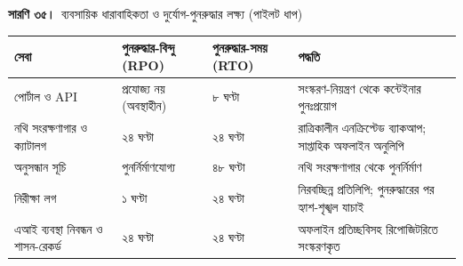 \documentclass[border=10pt]{standalone}
\begin{document}
\begin{minipage}{17cm}
{\large\bfseries সারণি ৩৫।}\ {\large ব্যবসায়িক ধারাবাহিকতা ও দুর্যোগ-পুনরুদ্ধার লক্ষ্য (পাইলট ধাপ)}\par\vspace{7pt}
\small
{}
\begin{tabularx}{\linewidth}{@{}>{\hsize=1.266\hsize\raggedright\arraybackslash}X>{\hsize=0.709\hsize\raggedright\arraybackslash}X>{\hsize=0.709\hsize\raggedright\arraybackslash}X>{\hsize=1.316\hsize\raggedright\arraybackslash}X@{}}
\arrayrulecolor{bapilrule}\toprule
\rowcolor{white}\textbf{সেবা} & \textbf{পুনরুদ্ধার-বিন্দু (RPO)} & \textbf{পুনরুদ্ধার-সময় (RTO)} & \textbf{পদ্ধতি} \\
\midrule
পোর্টাল ও API & প্রযোজ্য নয় (অবস্থাহীন) & ৮ ঘণ্টা & সংস্করণ-নিয়ন্ত্রণ থেকে কন্টেইনার পুনঃপ্রয়োগ \\
নথি সংরক্ষণাগার ও ক্যাটালগ & ২৪ ঘণ্টা & ২৪ ঘণ্টা & রাত্রিকালীন এনক্রিপ্টেড ব্যাকআপ; সাপ্তাহিক অফলাইন অনুলিপি \\
অনুসন্ধান সূচি & পুনর্নির্মাণযোগ্য & ৪৮ ঘণ্টা & নথি সংরক্ষণাগার থেকে পুনর্নির্মাণ \\
নিরীক্ষা লগ & ১ ঘণ্টা & ২৪ ঘণ্টা & নিরবচ্ছিন্ন প্রতিলিপি; পুনরুদ্ধারের পর হ্যাশ-শৃঙ্খল যাচাই \\
এআই ব্যবস্থা নিবন্ধন ও শাসন-রেকর্ড & ২৪ ঘণ্টা & ২৪ ঘণ্টা & অফলাইন প্রতিচ্ছবিসহ রিপোজিটরিতে সংস্করণকৃত \\
\bottomrule
\end{tabularx}
\par{}
\end{minipage}
\end{document}
